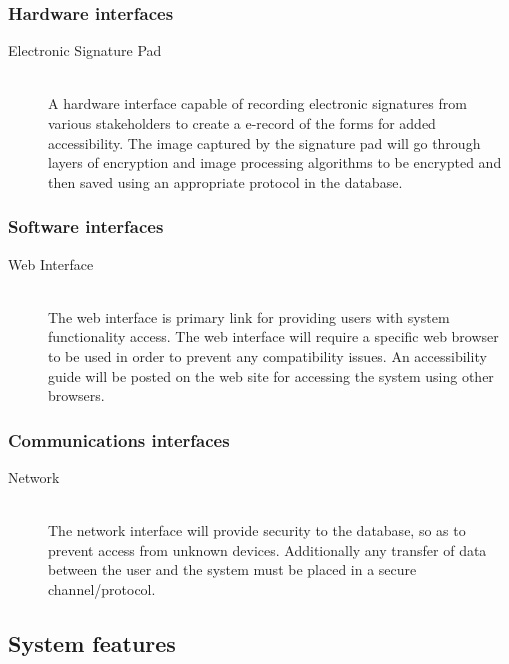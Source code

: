 \documentclass{journal}
\begin{document}
                \subsubsection{Hardware interfaces}

\begin{description}
\item[Electronic Signature Pad]\hfill \\
A hardware interface capable of recording electronic signatures from various stakeholders to create a e-record of the forms for added accessibility. The image captured by the signature pad will go through layers of encryption and image processing algorithms to be encrypted and then saved using an appropriate protocol in the database. 
\end{description}
        
                \subsubsection{Software interfaces}
\begin{description}
\item[Web Interface]\hfill \\
The web interface is primary link for providing users with system functionality access. The web interface will require a specific web browser to be used in order to prevent any compatibility issues. An accessibility guide will be posted on the web site for accessing the system using other browsers. 
\end{description}

                \subsubsection{Communications interfaces}
\begin{description}
\item[Network]\hfill \\
The network interface will provide security to the database, so as to prevent access from unknown devices. Additionally any transfer of data between the user and the system must be placed in a secure channel/protocol.  
\end{description}


\subsection{System features}
\end{document}
